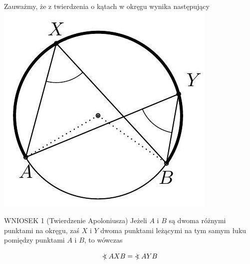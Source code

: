 \documentclass[10pt]{article}
\newcommand\Varangle{\mathop{{<\!\!\!\!\!\text{\small)}}\:}\nolimits}
\begin{document}
Zauważmy, że z twierdzenia o kątach w okręgu wynika następujący\\
\includegraphics[max width=\textwidth, center]{2024_11_21_71f62bd117d375398909g-187}

WNIOSEK 1 (Twierdzenie Apoloniusza) Jeżeli \(A\) i \(B\) są dwoma różnymi punktami na okręgu, zaś \(X\) i \(Y\) dwoma punktami leżącymi na tym samym łuku pomiędzy punktami \(A\) i \(B\), to wówczas

\[
\Varangle A X B=\Varangle A Y B
\]
\end{document}
